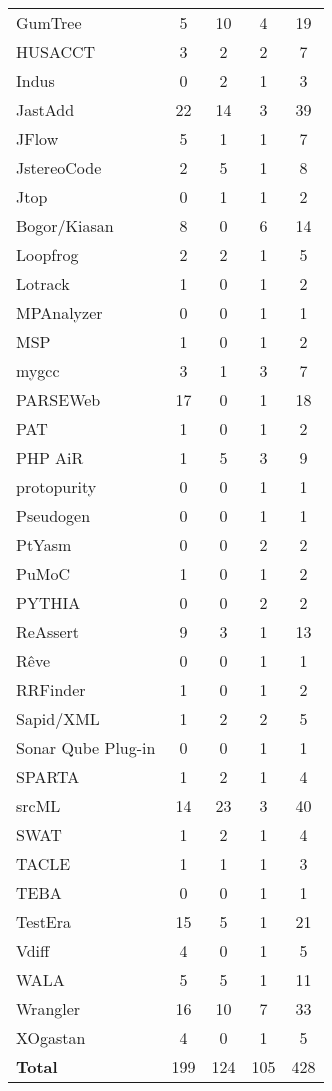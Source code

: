 \begin{longtable}{ l c c c c }
   GumTree & 5 & 10 & 4 & 19 \\
   HUSACCT & 3 & 2 & 2 & 7 \\
   Indus & 0 & 2 & 1 & 3 \\
   JastAdd & 22 & 14 & 3 & 39 \\
   JFlow & 5 & 1 & 1 & 7 \\
   JstereoCode & 2 & 5 & 1 & 8 \\
   Jtop & 0 & 1 & 1 & 2 \\
   Bogor/Kiasan & 8 & 0 & 6 & 14 \\
   Loopfrog & 2 & 2 & 1 & 5 \\
   Lotrack & 1 & 0 & 1 & 2 \\
   MPAnalyzer & 0 & 0 & 1 & 1 \\
   MSP & 1 & 0 & 1 & 2 \\
   mygcc & 3 & 1 & 3 & 7 \\
   PARSEWeb & 17 & 0 & 1 & 18 \\
   PAT & 1 & 0 & 1 & 2 \\
   PHP AiR & 1 & 5 & 3 & 9 \\
   protopurity & 0 & 0 & 1 & 1 \\
   Pseudogen & 0 & 0 & 1 & 1 \\
   PtYasm & 0 & 0 & 2 & 2 \\
   PuMoC & 1 & 0 & 1 & 2 \\
   PYTHIA & 0 & 0 & 2 & 2 \\
   ReAssert & 9 & 3 & 1 & 13 \\
   Rêve & 0 & 0 & 1 & 1 \\
   RRFinder & 1 & 0 & 1 & 2 \\
   Sapid/XML & 1 & 2 & 2 & 5 \\
   Sonar Qube Plug-in & 0 & 0 & 1 & 1 \\
   SPARTA & 1 & 2 & 1 & 4 \\
   srcML & 14 & 23 & 3 & 40 \\
   SWAT & 1 & 2 & 1 & 4 \\
   TACLE & 1 & 1 & 1 & 3 \\
   TEBA & 0 & 0 & 1 & 1 \\
   TestEra & 15 & 5 & 1 & 21 \\
   Vdiff & 4 & 0 & 1 & 5 \\
   WALA & 5 & 5 & 1 & 11 \\
   Wrangler & 16 & 10 & 7 & 33 \\
   XOgastan & 4 & 0 & 1 & 5 \\
  \hline
  {\bf Total} & 199 & 124 & 105 & 428 \\
\end{longtable}
